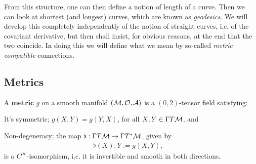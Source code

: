 \documentclass[12pt]{article} %
\begin{document}
From this structure, one can then define a notion of length of a curve. Then we can look at shortest (and longest) curves, which are known as \textit{geodesics}. We will develop this completely independently of the notion of straight curves, i.e. of the  covariant derivative, but then shall insist, for obvious reasons, at the end that the two coincide. In doing this we will define what we mean by so-called \textit{metric compatible} connections.

\subsection{Metrics}

\bd[Metric]
    A \textbf{metric} $g$ on a smooth manifold $(\mathcal{M},\mathcal{O},\mathcal{A})$ is a $(0,2)$-tensor field satisfying:
    \benr 
        \item It's symmetric; $g(X,Y) = g(Y,X)$, for all $X,Y\in\Gamma T\mathcal{M}$, and
        \item Non-degeneracy; the map $\flat : \Gamma T\mathcal{M}\to \Gamma T^*\mathcal{M}$, given by 
        \begin{align*}
            \flat(X) :Y := g(X,Y),
        \end{align*}
        is a $C^{\infty}$-isomorphism, i.e. it is invertible and smooth in both directions. 
    \een 
\ed 
\end{document}
